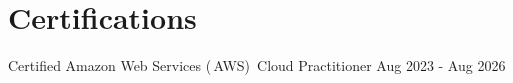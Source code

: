 \documentclass[letterpaper,11pt]{article}
\makeatletter
\newcommand{\resumeItem}[1]{
  \item\small{
    {#1 \vspace{-2pt}}
  }
}
\newcommand{\resumeSubheading}[4]{
  \vspace{-2pt}\item
    \begin{tabular*}{0.97\textwidth}[t]{l@{\extracolsep{\fill}}r}
      \textbf{#1} & #2 \\
      \textit{\small#3} & \textit{\small #4} \\
    \end{tabular*}\vspace{-7pt}
}
\newcommand{\resumeItemListStart}{\begin{itemize}}
\newcommand{\resumeItemListEnd}{\end{itemize}\vspace{-5pt}}
\makeatother
\begin{document}

\section{Certifications}
{\hspace*{0.5em} Certified Amazon Web Services (\,AWS)\, Cloud Practitioner}\hspace*{\fill} Aug 2023 - Aug 2026
\end{document}
